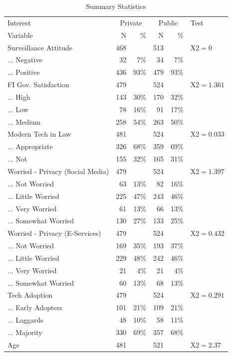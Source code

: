 \begin{table}[!htbp] 
\centering 
\small
\renewcommand*{\arraystretch}{1}
\caption{Summary Statistics}
\begin{tabular}{lrrrrl}
\hline
\hline
Interest & \multicolumn{2}{c}{Private} & \multicolumn{2}{c}{Public} & Test \\ 
Variable & N & \% & N & \% &  \\ 
\hline
Surveillance Attitude & 468 &  & 513 &  & X2$=0^{}$ \\ 
... Negative & 32 & 7\% & 34 & 7\% &  \\ 
... Positive & 436 & 93\% & 479 & 93\% &  \\ 
FI Gov. Satisfaction & 479 &  & 524 &  & X2$=1.361$ \\ 
... High & 143 & 30\% & 170 & 32\% &  \\ 
... Low & 78 & 16\% & 91 & 17\% &  \\ 
... Medium & 258 & 54\% & 263 & 50\% &  \\ 
Modern Tech in Law & 481 &  & 524 &  & X2$=0.033$ \\ 
... Appropriate & 326 & 68\% & 359 & 69\% &  \\ 
... Not & 155 & 32\% & 165 & 31\% &  \\ 
Worried - Privacy (Social Media) & 479 &  & 524 &  & X2$=1.397$ \\ 
... Not Worried & 63 & 13\% & 82 & 16\% &  \\ 
... Little Worried & 225 & 47\% & 243 & 46\% &  \\ 
... Very Worried & 61 & 13\% & 66 & 13\% &  \\ 
... Somewhat Worried & 130 & 27\% & 133 & 25\% &  \\ 
Worried - Privacy (E-Services) & 479 &  & 524 &  & X2$=0.432$ \\ 
... Not Worried & 169 & 35\% & 193 & 37\% &  \\ 
... Little Worried & 229 & 48\% & 242 & 46\% &  \\ 
... Very Worried & 21 & 4\% & 21 & 4\% &  \\ 
... Somewhat Worried & 60 & 13\% & 68 & 13\% &  \\ 
Tech Adoption & 479 &  & 524 &  & X2$=0.291$ \\ 
... Early Adopters & 101 & 21\% & 109 & 21\% &  \\ 
... Laggards & 48 & 10\% & 58 & 11\% &  \\ 
... Majority & 330 & 69\% & 357 & 68\% &  \\ 
Age & 481 &  & 521 &  & X2$=2.37$ \\ 

\end{tabular}
\end{table}
